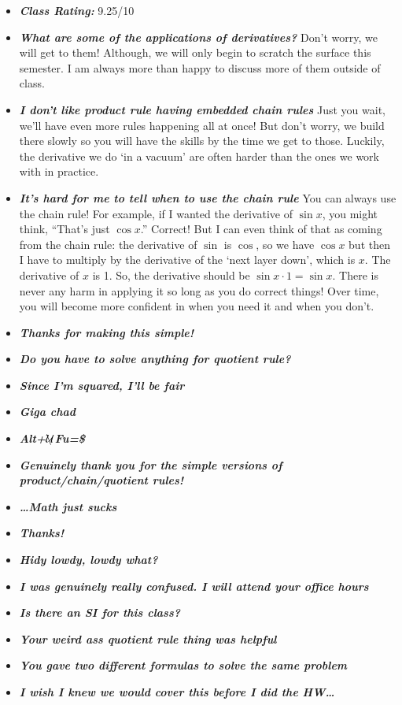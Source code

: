 \documentclass[11pt,letterpaper]{article}
\begin{document}
\begin{itemize}
\item {\bfseries\itshape Class Rating:} 9.25/10
\item {\bfseries\itshape What are some of the applications of derivatives?} Don't worry, we will get to them! Although, we will only begin to scratch the surface this semester. I am always more than happy to discuss more of them outside of class. 

\item {\bfseries\itshape I don't like product rule having embedded chain rules} Just you wait, we'll have even more rules happening all at once! But don't worry, we build there slowly so you will have the skills by the time we get to those. Luckily, the derivative we do `in a vacuum' are often harder than the ones we work with in practice.

\item {\bfseries\itshape It's hard for me to tell when to use the chain rule} You can always use the chain rule! For example, if I wanted the derivative of $\sin x$, you might think, ``That's just $\cos x$.'' Correct! But I can even think of that as coming from the chain rule: the derivative of $\sin$ is $\cos$, so we have $\cos x$ but then I have to multiply by the derivative of the `next layer down', which is $x$. The derivative of $x$ is 1. So, the derivative should be $\sin x \cdot 1= \sin x$. There is never any harm in applying it so long as you do correct things! Over time, you will become more confident in when you need it and when you don't. 







\item {\bfseries\itshape Thanks for making this simple!}
\item {\bfseries\itshape Do you have to solve anything for quotient rule?}
\item {\bfseries\itshape Since I'm squared, I'll be fair}
\item {\bfseries\itshape Giga chad}
\item {\bfseries\itshape Alt+$\mathrlap{\text{\textbackslash}}{\mathcal{U}}$Fu=\$}
\item {\bfseries\itshape Genuinely thank you for the simple versions of product/chain/quotient rules!}

\item {\bfseries\itshape \dots Math just sucks}
\item {\bfseries\itshape Thanks!}
\item {\bfseries\itshape Hidy lowdy, lowdy what?}
\item {\bfseries\itshape I was genuinely really confused. I will attend your office hours}
\item {\bfseries\itshape Is there an SI for this class?}
\item {\bfseries\itshape Your weird ass quotient rule thing was helpful}
 \item {\bfseries\itshape You gave two different formulas to solve the same problem}
 \item {\bfseries\itshape I wish I knew we would cover this before I did the HW\dots}


\end{itemize}
\end{document}
